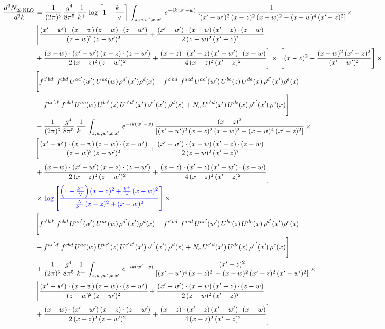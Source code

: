 \documentclass[9pt]{article}
\newcommand{\new}[1]{{\color{blue}#1}}
\numberwithin{equation}{section}
\begin{document}
\begin{align} 
    \frac{d^{3}N_{2b\,\rm NLO}^{\rm}}{d^{3}k}  & = \frac{1}{(2\pi)^{3}}\, \frac{g^{4}}{8\pi^{5}}\,\frac{1}{k^{+}}\, \log{\left[1-\frac{k^{+}}{\vee}\right]}\,\int_{z,w,w^{\prime},x,x'}\, e^{-ik(w^{\prime}-w)}\, \frac{1}{\left[(x'-w')^{2}\,(x-z)^{2}\,(x-w)^{2} - (x-w)^{4}\, (x'-z)^{2}\right]} \times\notag \\ & \Bigg[\frac{(x'-w')\cdot (x-w)\, (z-w)\cdot (z-w')}{(z-w)^{2}\, (z-w')^{2}}+\frac{(x'-w')\cdot (x-w)\, (x'-z)\cdot (z-w)}{2\, (z-w)^{2}\, (x'-z)^{2}}\notag \\ & +\frac{(x-w)\cdot (x'-w')\, (x-z)\cdot (z-w')}{2\, (x-z)^{2}\, (z-w')^{2}}+\frac{(x-z)\cdot (x'-z)\, (x'-w')\cdot (x-w)}{4\, (x-z)^{2}\, (x'-z)^{2}}\Bigg] \times\,\Bigg[(x-z)^{2} - \frac{(x-w)^{2}\, (x'-z)^{2}}{(x'-w')^{2}}\Bigg]\,\times \notag \\ & \Bigg[f^{c'bd'}\,f^{cbd}\, U^{ac'}(w')\,U^{ac}(w)\,\rho^{d'}(x')\rho^{d}(x)- f^{c'bd'}\,f^{acd}\,U^{ac'}(w')\,U^{bc}(z)\,U^{de}(x)\,\rho^{d'}(x')\rho^{e}(x) \notag \\ & -f^{ac'd'}\,f^{cbd}\,U^{ac}(w)\,U^{bc'}(z)\,U^{e'd'}(x')\,\rho^{e'}(x')\,\rho^{d}(x) +N_{c}\,U^{e'd}(x')\,U^{de}(x)\,\rho^{e'}(x')\,\rho^{e}(x)\Bigg]\notag \\ &  - \frac{1}{(2\pi)^{3}}\, \frac{g^{4}}{8\pi^{5}}\,\frac{1}{k^{+}}\,\int_{z,w,w^{\prime},x,x'}\, e^{-ik(w^{\prime}-w)}\, \frac{(x-z)^{2}}{\left[(x'-w')^{2}\,(x-z)^{2}\,(x-w)^{2} - (x-w)^{4}\, (x'-z)^{2}\right]}\,  \times\notag \\ & \Bigg[\frac{(x'-w')\cdot (x-w)\, (z-w)\cdot (z-w')}{(z-w)^{2}\, (z-w')^{2}}+\frac{(x'-w')\cdot (x-w)\, (x'-z)\cdot (z-w)}{2\, (z-w)^{2}\, (x'-z)^{2}}\notag \\ & +\frac{(x-w)\cdot (x'-w')\, (x-z)\cdot (z-w')}{2\, (x-z)^{2}\, (z-w')^{2}}+\frac{(x-z)\cdot (x'-z)\, (x'-w')\cdot (x-w)}{4\, (x-z)^{2}\, (x'-z)^{2}}\Bigg] \notag \\ & \times\,\new{\log{\left[\frac{\left(1-\frac{k^{+}}{\vee}\right)(x-z)^{2}+\frac{k^{+}}{\vee}\,(x-w)^{2}}{\frac{\Lambda}{k^{+}}\,(x-z)^{2}+(x-w)^{2}}\right]}}\,\times \notag \\ & \Bigg[f^{c'bd'}\,f^{cbd}\, U^{ac'}(w')\,U^{ac}(w)\,\rho^{d'}(x')\rho^{d}(x)- f^{c'bd'}\,f^{acd}\,U^{ac'}(w')\,U^{bc}(z)\,U^{de}(x)\,\rho^{d'}(x')\rho^{e}(x) \notag \\ & -f^{ac'd'}\,f^{cbd}\,U^{ac}(w)\,U^{bc'}(z)\,U^{e'd'}(x')\,\rho^{e'}(x')\,\rho^{d}(x) +N_{c}\,U^{e'd}(x')\,U^{de}(x)\,\rho^{e'}(x')\,\rho^{e}(x)\Bigg]\notag \\ &  + \frac{1}{(2\pi)^{3}}\, \frac{g^{4}}{8\pi^{5}}\,\frac{1}{k^{+}}\,\int_{z,w,w^{\prime},x,x'}\, e^{-ik(w^{\prime}-w)}\, \frac{(x'-z)^{2}}{\left[(x'-w')^{4}\,(x-z)^{2}\, - (x-w)^{2}\, (x'-z)^{2}\,(x'-w')^{2}\right]}\,  \times\notag \\ & \Bigg[\frac{(x'-w')\cdot (x-w)\, (z-w)\cdot (z-w')}{(z-w)^{2}\, (z-w')^{2}}+\frac{(x'-w')\cdot (x-w)\, (x'-z)\cdot (z-w)}{2\, (z-w)^{2}\, (x'-z)^{2}}\notag \\ & +\frac{(x-w)\cdot (x'-w')\, (x-z)\cdot (z-w')}{2\, (x-z)^{2}\, (z-w')^{2}}+\frac{(x-z)\cdot (x'-z)\, (x'-w')\cdot (x-w)}{4\, (x-z)^{2}\, (x'-z)^{2}}\Bigg] \notag \\ & 
\end{align}
\end{document}
